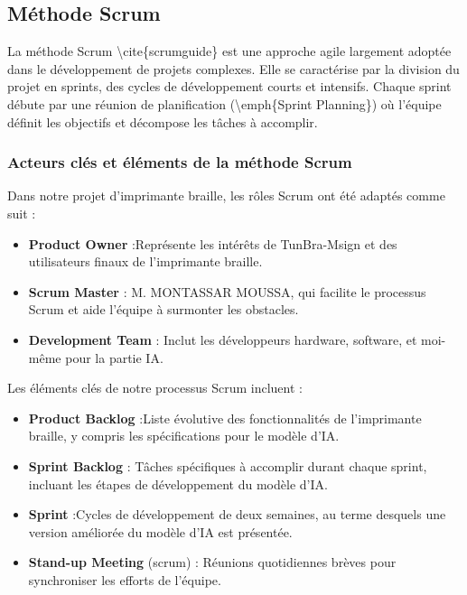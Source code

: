 \subsection{Méthode Scrum}

La méthode Scrum \textbackslash{}cite\{scrumguide\} est une approche agile largement adoptée dans le développement de projets complexes. Elle se caractérise par la division du projet en sprints, des cycles de développement courts et intensifs. Chaque sprint débute par une réunion de planification (\textbackslash{}emph\{Sprint Planning\}) où l'équipe définit les objectifs et décompose les tâches à accomplir. 

\subsubsection{Acteurs clés et éléments de la méthode Scrum }

Dans notre projet d'imprimante braille, les rôles Scrum ont été adaptés comme suit : 

\begin{itemize}
    \item \textbf{Product Owner} :Représente les intérêts de TunBra-Msign et des utilisateurs finaux de l'imprimante braille. 
    \item \textbf{Scrum Master} : M. MONTASSAR MOUSSA, qui facilite le processus Scrum et aide l'équipe à surmonter les obstacles. 
    \item \textbf{Development Team} : Inclut les développeurs hardware, software, et moi-même pour la partie IA. 
\end{itemize}

Les éléments clés de notre processus Scrum incluent :

\begin{itemize}
    \item \textbf{Product Backlog} :Liste évolutive des fonctionnalités de l'imprimante braille, y compris les spécifications pour le modèle d'IA. 
    \item \textbf{Sprint Backlog} : Tâches spécifiques à accomplir durant chaque sprint, incluant les étapes de développement du modèle d'IA. 
    \item \textbf{Sprint} :Cycles de développement de deux semaines, au terme desquels une version améliorée du modèle d'IA est présentée. 
    \item \textbf{Stand-up Meeting} (scrum) : Réunions quotidiennes brèves pour synchroniser les efforts de l'équipe. 
\end{itemize}


